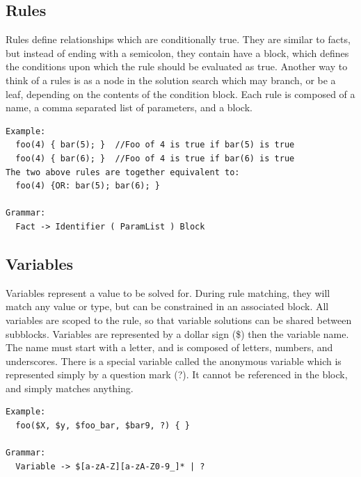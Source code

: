 \documentclass[onecolumn,titlepage]{article}
\begin{document}
\subsection{Rules}
Rules define relationships which are conditionally true.  They are similar to facts, but
instead of ending with a semicolon, they contain have a block, which defines the conditions
upon which the rule should be evaluated as true.  Another way to think of a rules is as
a node in the solution search which may branch, or be a leaf, depending on the contents
of the condition block. Each rule is composed of a name, a comma separated list of parameters,
and a block.

\begin{verbatim}
Example:
  foo(4) { bar(5); }  //Foo of 4 is true if bar(5) is true
  foo(4) { bar(6); }  //Foo of 4 is true if bar(6) is true
The two above rules are together equivalent to:
  foo(4) {OR: bar(5); bar(6); }

Grammar:
  Fact -> Identifier ( ParamList ) Block
\end{verbatim}

\subsection{Variables}
Variables represent a value to be solved for.  During rule matching, they will match any
value or type, but can be constrained in an associated block.  All variables are scoped to
the rule, so that variable solutions can be shared between subblocks.
Variables are represented by a dollar sign (\$) then the variable name. The name must
start with a letter, and is composed of letters, numbers, and underscores.  There is a special
variable called the anonymous variable which is represented simply by a question mark (?).  It
cannot be referenced in the block, and simply matches anything.
\begin{verbatim}
Example:
  foo($X, $y, $foo_bar, $bar9, ?) { }

Grammar:
  Variable -> $[a-zA-Z][a-zA-Z0-9_]* | ?
\end{verbatim}
\end{document}
